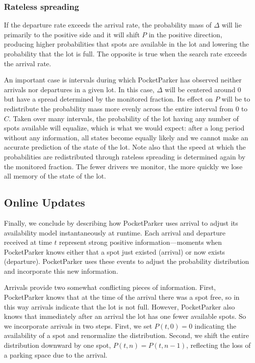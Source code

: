 \documentclass{sigchi}
\begin{document}
\subsubsection{Rateless spreading}

If the departure rate exceeds the arrival rate, the probability mass of
$\Delta$ will lie primarily to the positive side and it will shift $P$ in the
positive direction, producing higher probabilities that spots are available
in the lot and lowering the probability that the lot is full. The opposite is
true when the search rate exceeds the arrival rate.

An important case is intervals during which PocketParker has observed neither
arrivals nor departures in a given lot. In this case, $\Delta$ will be
centered around $0$ but have a spread determined by the monitored fraction.
Its effect on $P$ will be to redistribute the probability mass more evenly
across the entire interval from $0$ to $C$. Taken over many intervals, the
probability of the lot having any number of spots available will equalize,
which is what we would expect: after a long period without any information,
all states become equally likely and we cannot make an accurate prediction of
the state of the lot. Note also that the speed at which the probabilities are
redistributed through rateless spreading is determined again by the monitored
fraction. The fewer drivers we monitor, the more quickly we lose all memory
of the state of the lot.

\subsection{Online Updates}

Finally, we conclude by describing how PocketParker uses arrival to adjust
its availability model instantaneously at runtime. Each arrival and departure
received at time $t$ represent strong positive information---moments when
PocketParker knows either that a spot just existed (arrival) or now exists
(departure). PocketParker uses these events to adjust the probability
distribution and incorporate this new information. 

Arrivals provide two somewhat conflicting pieces of information. First,
PocketParker knows that at the time of the arrival there was a spot free, so
in this way arrivals indicate that the lot is not full. However, PocketParker
also knows that immediately after an arrival the lot has one fewer available
spots. So we incorporate arrivals in two steps. First, we set $P(t, 0) = 0$
indicating the availability of a spot and renormalize the distribution.
Second, we shift the entire distribution downward by one spot, $P(t, n) =
P(t, n - 1)$, reflecting the loss of a parking space due to the arrival.
\end{document}

